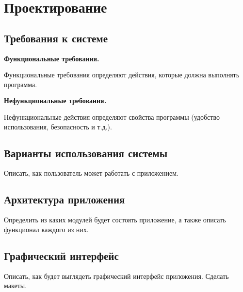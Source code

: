 \newpage
\section{Проектирование}
\label{sec:Definition}
 
\subsection{Требования к системе}
\textbf{Функциональные требования.}

Функциональные требования определяют действия, которые должна выполнять программа.

\textbf{Нефункциональные требования.}

Нефункциональные действия определяют свойства программы (удобство использования, безопасность и т.д.). 
\vspace{2em}
\subsection{Варианты использования системы}
Описать, как пользователь может работать с приложением.
\vspace{2em}
\subsection{Архитектура приложения}
Определить из каких модулей будет состоять приложение, а также описать функционал каждого из них.
\vspace{2em}
\subsection{Графический интерфейс}
Описать, как будет выглядеть графический интерфейс приложения. Сделать макеты.